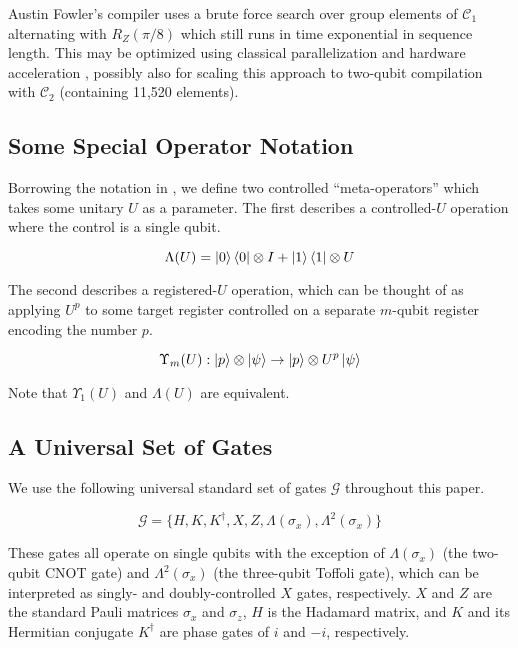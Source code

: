 Austin Fowler's compiler uses a brute force search over group elements of
$\mathcal{C}_1$ alternating with $R_Z(\pi/8)$ which still runs in time
exponential in sequence length.
This may be optimized using classical parallelization and hardware acceleration
\cite{Booth2012}, possibly also for scaling this approach to
two-qubit compilation with $\mathcal{C}_2$ (containing 11,520
elements).

\subsection{Some Special Operator Notation}

Borrowing the notation in \cite{ksv02},
we define two controlled ``meta-operators'' which takes some unitary $U$ as
a parameter. The first describes a controlled-$U$ operation where the control
is a single qubit.

\begin{displaymath}
\Lambda(U) = \left\vert{0}\right\rangle\left\langle{0}\right\vert \otimes I + \left\vert{1}\right\rangle\left\langle{1}\right\vert \otimes U
\end{displaymath}

The second describes a registered-$U$ operation, which
can be thought of as applying $U^p$ to some target register
controlled on a separate $m$-qubit register
encoding the number $p$.

\begin{displaymath}
\Upsilon_m(U) : \left\vert{p}\right\rangle \otimes \left\vert{\psi}\right\rangle \rightarrow \left\vert{p}\right\rangle
\otimes U^p\left\vert{\psi}\right\rangle
\end{displaymath}

Note that $\Upsilon_1(U)$ and $\Lambda(U)$ are equivalent.

\subsection{A Universal Set of Gates}

We use the following universal standard set of gates $\mathcal{G}$ throughout
this paper.

\begin{displaymath}
\mathcal{G} = \{ H, K, K^{\dagger}, X, Z,
\Lambda(\sigma_x), \Lambda^2(\sigma_x) \}
\end{displaymath}

These gates all operate on single qubits with the
exception of $\Lambda(\sigma_x)$ (the two-qubit CNOT gate)
and $\Lambda^2(\sigma_x)$ (the three-qubit Toffoli gate),
which can be interpreted as singly- and doubly-controlled
$X$ gates, respectively. $X$ and $Z$ are the standard Pauli matrices
$\sigma_x$ and $\sigma_z$, $H$ is the Hadamard matrix, and $K$ and its
Hermitian conjugate $K^{\dagger}$ are phase gates of $i$ and $-i$,
respectively.

